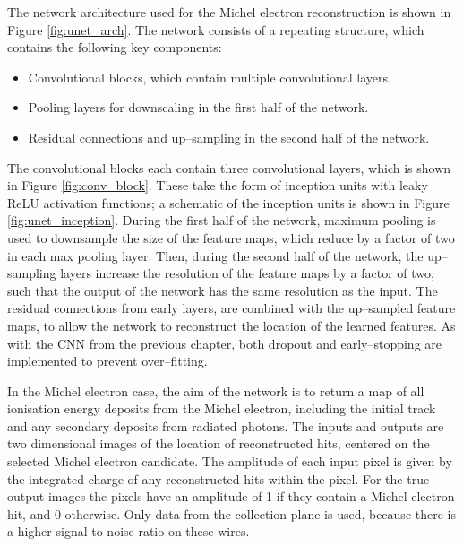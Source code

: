 The network architecture used for the Michel electron reconstruction is shown in
Figure \ref{fig:unet_arch}. The network consists of a repeating structure, which
contains the following key components:
\begin{itemize}
	\item Convolutional blocks, which contain multiple convolutional layers.
	\item Pooling layers for downscaling in the first half of the network.
	\item Residual connections and up--sampling in the second half of the network.
\end{itemize}
The convolutional blocks each contain three convolutional layers, which is
shown in Figure \ref{fig:conv_block}. These take the form of inception
units\cite{Szegedy2015} with leaky ReLU activation functions; a schematic of
the inception units is shown in Figure \ref{fig:unet_inception}. During the
first half of the network, maximum pooling is used to downsample the size of
the feature maps, which reduce by a factor of two in each max pooling layer.
Then, during the second half of the network, the up--sampling layers increase
the resolution of the feature maps by a factor of two, such that the output of
the network has the same resolution as the input. The residual connections
from early layers, are combined with the up--sampled feature maps, to allow
the network to reconstruct the location of the learned features. As with the
CNN from the previous chapter, both dropout and early--stopping are
implemented to prevent over--fitting.

In the Michel electron case, the aim of the network is to return a map of all
ionisation energy deposits from the Michel electron, including the initial
track and any secondary deposits from radiated photons. The inputs and outputs
are two dimensional images of the location of reconstructed hits, centered on
the selected Michel electron candidate. The amplitude of each input pixel is
given by the integrated charge of any reconstructed hits within the pixel. For
the true output images the pixels have an amplitude of 1 if they contain a
Michel electron hit, and 0 otherwise. Only data from the collection plane is
used, because there is a higher signal to noise ratio on these wires.


